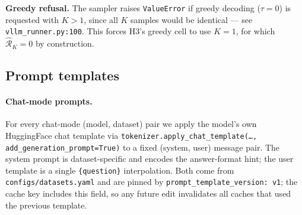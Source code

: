 \textbf{Greedy refusal.}
The sampler raises \texttt{ValueError} if greedy decoding
($\tau{=}0$) is requested with $K{>}1$, since all $K$ samples would
be identical — see \texttt{vllm\_runner.py:100}. This forces H3's
greedy cell to use $K{=}1$, for which $\hat{\mathcal R}_K = 0$ by construction.

\subsection{Prompt templates}
\label{app:config:prompts}

\paragraph{Chat-mode prompts.}
For every chat-mode (model, dataset) pair we apply the model's own
HuggingFace chat template via
\texttt{tokenizer.apply\_chat\_template(\ldots, add\_generation\_prompt=True)}
to a fixed (system, user) message pair. The system prompt is dataset-specific
and encodes the answer-format hint; the user template is a single
\texttt{\{question\}} interpolation. Both come from
\texttt{configs/datasets.yaml} and are pinned by
\texttt{prompt\_template\_version: v1}; the cache key includes this
field, so any future edit invalidates all caches that used the previous
template.

